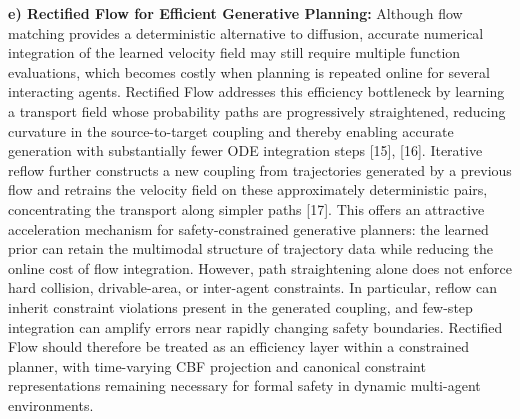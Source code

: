 \noindent\textbf{e) Rectified Flow for Efficient Generative Planning:}
Although flow matching provides a deterministic alternative to diffusion,
accurate numerical integration of the learned velocity field may still
require multiple function evaluations, which becomes costly when planning is
repeated online for several interacting agents. Rectified Flow addresses this
efficiency bottleneck by learning a transport field whose probability paths
are progressively straightened, reducing curvature in the source-to-target
coupling and thereby enabling accurate generation with substantially fewer
ODE integration steps [15], [16]. Iterative reflow further constructs a new
coupling from trajectories generated by a previous flow and retrains the
velocity field on these approximately deterministic pairs, concentrating the
transport along simpler paths [17]. This offers an attractive acceleration
mechanism for safety-constrained generative planners: the learned prior can
retain the multimodal structure of trajectory data while reducing the online
cost of flow integration. However, path straightening alone does not enforce
hard collision, drivable-area, or inter-agent constraints. In particular,
reflow can inherit constraint violations present in the generated coupling,
and few-step integration can amplify errors near rapidly changing safety
boundaries. Rectified Flow should therefore be treated as an efficiency layer
within a constrained planner, with time-varying CBF projection and canonical
constraint representations remaining necessary for formal safety in dynamic
multi-agent environments.
